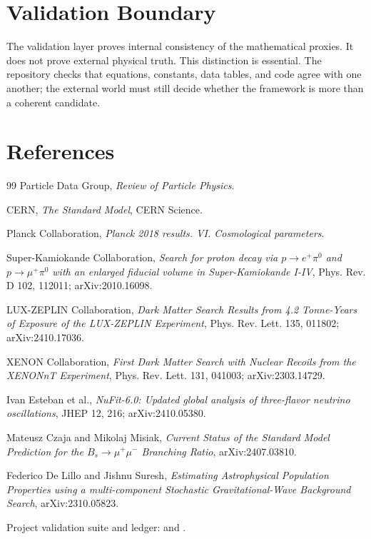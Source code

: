 \documentclass[12pt]{article}
\theoremstyle{remark}
\begin{document}
\section{Validation Boundary}

The validation layer proves internal consistency of the mathematical proxies.
It does not prove external physical truth.  This distinction is essential.  The
repository checks that equations, constants, data tables, and code agree with
one another; the external world must still decide whether the framework is more
than a coherent candidate.

\section{References}

\begin{thebibliography}{99}
Particle Data Group, \emph{Review of Particle Physics}.

CERN, \emph{The Standard Model}, CERN Science.

Planck Collaboration, \emph{Planck 2018 results. VI. Cosmological parameters}.

Super-Kamiokande Collaboration, \emph{Search for proton decay via
$p\to e^+\pi^0$ and $p\to\mu^+\pi^0$ with an enlarged fiducial volume in
Super-Kamiokande I-IV}, Phys. Rev. D 102, 112011; arXiv:2010.16098.

LUX-ZEPLIN Collaboration, \emph{Dark Matter Search Results from 4.2 Tonne-Years
of Exposure of the LUX-ZEPLIN Experiment}, Phys. Rev. Lett. 135, 011802;
arXiv:2410.17036.

XENON Collaboration, \emph{First Dark Matter Search with Nuclear Recoils from
the XENONnT Experiment}, Phys. Rev. Lett. 131, 041003; arXiv:2303.14729.

Ivan Esteban et al., \emph{NuFit-6.0: Updated global analysis of three-flavor
neutrino oscillations}, JHEP 12, 216; arXiv:2410.05380.

Mateusz Czaja and Mikolaj Misiak, \emph{Current Status of the Standard Model
Prediction for the $B_s\to\mu^+\mu^-$ Branching Ratio}, arXiv:2407.03810.

Federico De Lillo and Jishnu Suresh, \emph{Estimating Astrophysical Population
Properties using a multi-component Stochastic Gravitational-Wave Background
Search}, arXiv:2310.05823.

Project validation suite and ledger:
 and .
\end{thebibliography}
\end{document}
